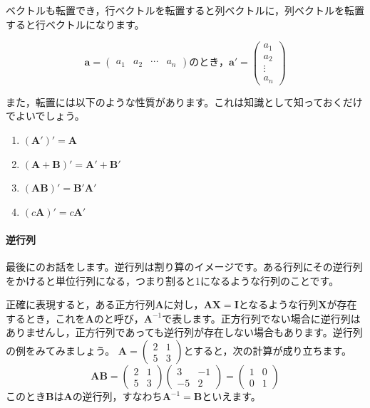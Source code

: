 \documentclass{ltjsbook}
\begin{document}
ベクトルも転置でき，行ベクトルを転置すると列ベクトルに，列ベクトルを転置すると行ベクトルになります。

\begin{equation*}
	\bm{a} =
	\begin{pmatrix}
		a_1 & a_2 & \cdots & a_n
	\end{pmatrix}
	\mbox{のとき，}
	\bm{a}'=
	\begin{pmatrix}
		a_1    \\
		a_2    \\
		\vdots \\
		a_n
	\end{pmatrix}
\end{equation*}

また，転置には以下のような性質があります。これは知識として知っておくだけでよいでしょう。
\begin{enumerate}
	\item $(\bm{A} ')' = \bm{A}$
	\item $(\bm{A} + \bm{B} )' = \bm{A}' + \bm{B}'$
	\item $(\bm{A} \bm{B})'=\bm{B}'\bm{A}'$
	\item $(c\bm{A})'=c\bm{A}'$
\end{enumerate}

\paragraph{逆行列}
最後にのお話をします。逆行列は割り算のイメージです。ある行列にその逆行列をかけると単位行列になる，つまり割ると1になるような行列のことです。

正確に表現すると，ある正方行列$\bm{A}$に対し，$\bm{A}\bm{X}=\bm{I}$となるような行列$\bm{X}$が存在するとき，これを$\bm{A}$のと呼び，$\bm{A}^{-1}$で表します。正方行列でない場合に逆行列はありませんし，正方行列であっても逆行列が存在しない場合もあります。逆行列の例をみてみましょう。
$\bm{A}=\begin{pmatrix}2&1\\5&3\end{pmatrix}$とすると，次の計算が成り立ちます。
\begin{equation*}
	\bm{AB}=\begin{pmatrix}2&1\\5&3\end{pmatrix}\begin{pmatrix}3&-1\\-5&2\end{pmatrix}=\begin{pmatrix}1&0\\0&1\end{pmatrix}
\end{equation*}
このとき$\bm{B}$は$\bm{A}$の逆行列，すなわち$\bm{A}^{-1}=\bm{B}$といえます。
\end{document}
